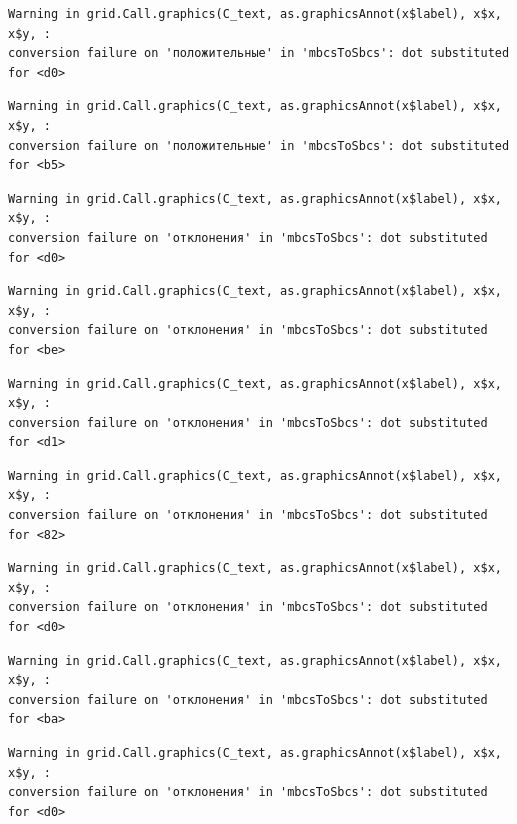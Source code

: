 \documentclass[
  letterpaper,
  DIV=11,
  numbers=noendperiod]{scrreprt}
\theoremstyle{definition}
\theoremstyle{remark}
\begin{document}
\begin{verbatim}
Warning in grid.Call.graphics(C_text, as.graphicsAnnot(x$label), x$x, x$y, :
conversion failure on 'положительные' in 'mbcsToSbcs': dot substituted for <d0>
\end{verbatim}

\begin{verbatim}
Warning in grid.Call.graphics(C_text, as.graphicsAnnot(x$label), x$x, x$y, :
conversion failure on 'положительные' in 'mbcsToSbcs': dot substituted for <b5>
\end{verbatim}

\begin{verbatim}
Warning in grid.Call.graphics(C_text, as.graphicsAnnot(x$label), x$x, x$y, :
conversion failure on 'отклонения' in 'mbcsToSbcs': dot substituted for <d0>
\end{verbatim}

\begin{verbatim}
Warning in grid.Call.graphics(C_text, as.graphicsAnnot(x$label), x$x, x$y, :
conversion failure on 'отклонения' in 'mbcsToSbcs': dot substituted for <be>
\end{verbatim}

\begin{verbatim}
Warning in grid.Call.graphics(C_text, as.graphicsAnnot(x$label), x$x, x$y, :
conversion failure on 'отклонения' in 'mbcsToSbcs': dot substituted for <d1>
\end{verbatim}

\begin{verbatim}
Warning in grid.Call.graphics(C_text, as.graphicsAnnot(x$label), x$x, x$y, :
conversion failure on 'отклонения' in 'mbcsToSbcs': dot substituted for <82>
\end{verbatim}

\begin{verbatim}
Warning in grid.Call.graphics(C_text, as.graphicsAnnot(x$label), x$x, x$y, :
conversion failure on 'отклонения' in 'mbcsToSbcs': dot substituted for <d0>
\end{verbatim}

\begin{verbatim}
Warning in grid.Call.graphics(C_text, as.graphicsAnnot(x$label), x$x, x$y, :
conversion failure on 'отклонения' in 'mbcsToSbcs': dot substituted for <ba>
\end{verbatim}

\begin{verbatim}
Warning in grid.Call.graphics(C_text, as.graphicsAnnot(x$label), x$x, x$y, :
conversion failure on 'отклонения' in 'mbcsToSbcs': dot substituted for <d0>
\end{verbatim}
\end{document}
